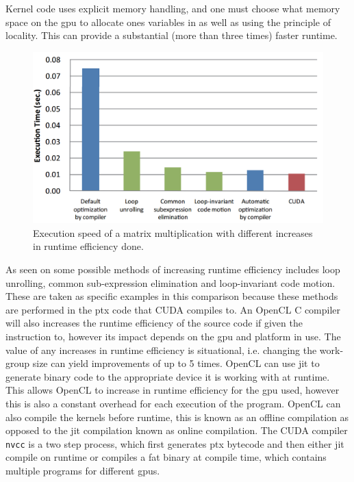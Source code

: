 Kernel code uses explicit memory handling, and one must choose what memory space on the \acrshort{gpu} to allocate ones variables in as well as using the principle of locality.
This can provide a substantial (more than three times) faster runtime. \citep{ocl_lecture3}
\begin{figure}[h]
\centering	
 \includegraphics[width=1\textwidth]{figures/opencloptimisation.png} %
\caption{Execution speed of a matrix multiplication with different increases in runtime efficiency done.  \citep{CUDAOpenCLOptimisation}}\label{image:OpenCLOptCompare}
\vspace{-15pt}
\end{figure}
As seen on  some possible methods of increasing runtime efficiency includes loop unrolling, common sub-expression elimination and loop-invariant code motion. 
These are taken as specific examples in this comparison because these methods are performed in the \acrfull{ptx} code that CUDA compiles to.
An OpenCL C compiler will also increases the runtime efficiency of the source code if given the instruction to, however its impact depends on the \acrshort{gpu} and platform in use.
The value of any increases in runtime efficiency is situational, i.e. changing the work-group size can yield improvements of up to 5 times. \citep{ocl_lecture3}
OpenCL can use \acrshort{jit} to generate binary code to the appropriate device it is working with at runtime.
This allows OpenCL to increase in runtime efficiency for the \acrshort{gpu} used, however this is also a constant overhead for each execution of the program. 
OpenCL can also compile the kernels before runtime, this is known as an offline compilation as opposed to the \acrshort{jit} compilation known as online compilation. 
The CUDA compiler \texttt{nvcc} is a two step process, which first generates \acrshort{ptx} bytecode and then either \acrshort{jit} compile on runtime or compiles a fat binary at compile time, which contains multiple programs for different \acrshort{gpu}s. \citep{nvidia_cude_fat_bin}

